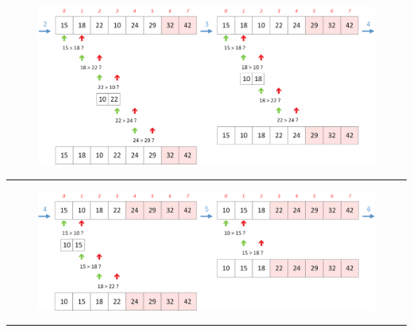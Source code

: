 \documentclass[11pt,a4paper]{article}
\begin{document}
\clearpage

\begin{figure}[ht!]
\centering
\centerline{
\includegraphics[width=1.2\textwidth]{img/tris/2_per_pages/BubbleSort_part2.png}
}
\end{figure}

\vfillFirst

\par\rule{\textwidth}{0.5pt} 

\medskip

\begin{figure}[ht!]
\centering
\centerline{
\includegraphics[width=1.2\textwidth]{img/tris/2_per_pages/BubbleSort_part3.png}
}
\end{figure}

\medskip

\par\rule{\textwidth}{0.5pt} 

\vfillLast
\end{document}
